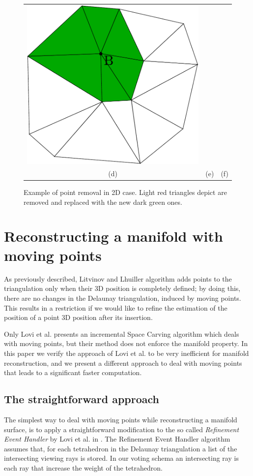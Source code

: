 \begin{figure}[t]
\begin{tabular}{ccc}
\includegraphics[width=0.33\columnwidth]{./img//delaunayExampleMoving06}\\(d)&(e)&(f)
\end{tabular}
\caption{Example of point removal in 2D case. Light red triangles depict are removed and replaced with the new dark green ones.}
\label{fig:moving_ch5}
\end{figure}

\section{Reconstructing a manifold with moving points}
\label{sec:3D-Reconstruction_2}
As previously described, Litvinov and Lhuiller \cite{litvinov_lhuillier_13} algorithm adds points to the triangulation only when their 3D position is completely defined; by doing this, there are no changes in the Delaunay triangulation, induced by moving points. This  results in a restriction if we would like to refine the estimation of the position of a point 3D position after its insertion.

Only Lovi et al. \cite{lovi_et_al_11} presents an incremental Space Carving algorithm which deals with moving points, but their method does not enforce the manifold property.
In this paper we verify the approach of Lovi et al. \cite{lovi_et_al_11} to be very inefficient for manifold reconstruction, and we present a different approach to deal with moving points that leads to a significant faster computation.


\subsection{The straightforward approach}
\label{subsec:straightforward_way}
The simplest way to deal with moving points while reconstructing a manifold surface, is to apply a straightforward modification to the so called \emph{Refinement Event Handler} by Lovi et al. in \cite{lovi_et_al_11}.
The Refinement Event Handler algorithm assumes that, for each tetrahedron in the Delaunay triangulation a list of the intersecting viewing rays is stored. In our voting schema an intersecting ray is each ray that increase the weight of the tetrahedron. 

